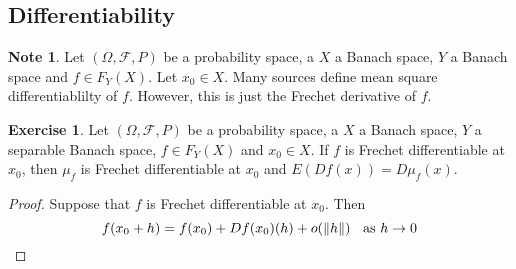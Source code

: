 \documentclass[12pt]{amsart}
\theoremstyle{definition}
\newtheorem{note}[definition]{Note}
\newtheorem{ex}[definition]{Exercise}
\newcommand{\Om}{\Omega}
\newcommand{\MF}{\mathcal{F}}
\begin{document}
	
	\subsection{Differentiability}	
	
	\begin{note}
	Let $(\Om, \MF, P)$ be a probability space,  a $X$ a Banach space, $Y$ a Banach space and $f \in F_Y(X)$. Let $x_0 \in X$. Many sources define mean square differentiablilty of $f$. However, this is just the Frechet derivative of $f$.
	\end{note}
	
	\begin{ex}
	Let $(\Om, \MF, P)$ be a probability space,  a $X$ a Banach space, $Y$ a separable Banach space, $f \in F_Y(X)$ and $x_0 \in X$. If $f$ is Frechet differentiable at $x_0$, then $\mu_f$ is Frechet differentiable at $x_0$ and $E(Df(x)) = D\mu_f(x)$.
	\end{ex}
	
	\begin{proof}
	Suppose that $f$ is Frechet differentiable at $x_0$. Then $$f(x_0+h) = f(x_0) + Df(x_0)(h) + o(\|h\|) \hspace{.2cm} \text{  as } h \rightarrow 0$$
	\end{proof}
	
		
	
\end{document}
